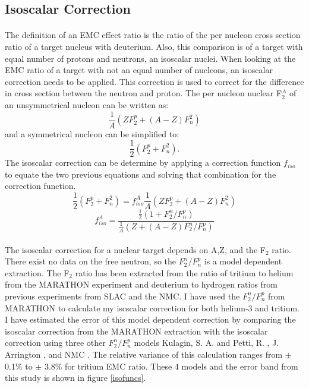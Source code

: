 
\subsection{Isoscalar Correction}
	\paragraph{}The definition of an EMC effect ratio is the ratio of the per nucleon cross section ratio of a target nucleus with deuterium. Also,  this comparison is of a target with equal number of protons and neutrons, an isoscalar nuclei. When looking at the EMC ratio of a target with not an equal number of nucleons, an isoscalar correction needs to be applied. This correction is used to correct for the difference in cross section between the neutron and proton. The per nucleon nuclear F$_2^A $ of an unsymmetrical nucleon can be written as:
	\begin{equation}
	\frac{1}{A}\left(ZF^p_2 + \left(A-Z\right)F^2_n\right)\nonumber
	\end{equation}
	and a symmetrical nucleon can be simplified to:
	\begin{equation}
		\frac{1}{2}\left(F^p_2 + F^2_n\right).\nonumber
	\end{equation}	
	The isoscalar correction can be determine by applying a correction function $f_{iso}$ to equate the two previous equations and solving that combination for the correction function.
	\begin{equation}
		\frac{1}{2}\left(F^p_2 + F^2_n\right) =  f^A_{iso}\frac{1}{A}\left(ZF^p_2 + \left(A-Z\right)F^2_n\right)\nonumber
	\end{equation}
	\begin{equation}
	f^A_{iso} = \frac{\frac{1}{2}\left(1+F^n_2/F^p_n\right)}{\frac{1}{A}\left(Z +(A-Z)F^n_2/F^p_n\right)} \label{isoC}
	\end{equation}
	\paragraph{}The isoscalar correction for a nuclear target depends on A,Z, and the F$_2$ ratio. There exist no data on the free neutron, so the $F^n_2/F^p_n$ is a model dependent extraction. The  F$_2$ ratio has been extracted from the ratio of tritium to helium from the MARATHON experiment and deuterium to hydrogen ratios from previous experiments from SLAC and the NMC. I have used the $F^n_2/F^p_n$ from MARATHON to calculate my iscscalar correction for both helium-3 and tritium. I have estimated the error of this model dependent correction by comparing the isoscalar correction from the MARATHON extraction with the isoscalar correction using three other $F^n_2/F^p_n$ models Kulagin, S. A. and Petti, R. \cite{kpmodel}, J. Arrington \cite{JA_FR}, and NMC \cite{NMC_ratio}. The relative variance of this calculation ranges from $\pm$ 0.1\% to $\pm$ 3.8\% for tritium EMC ratio. These 4 models and the error band from this study is shown in figure \ref{isofuncs}.

